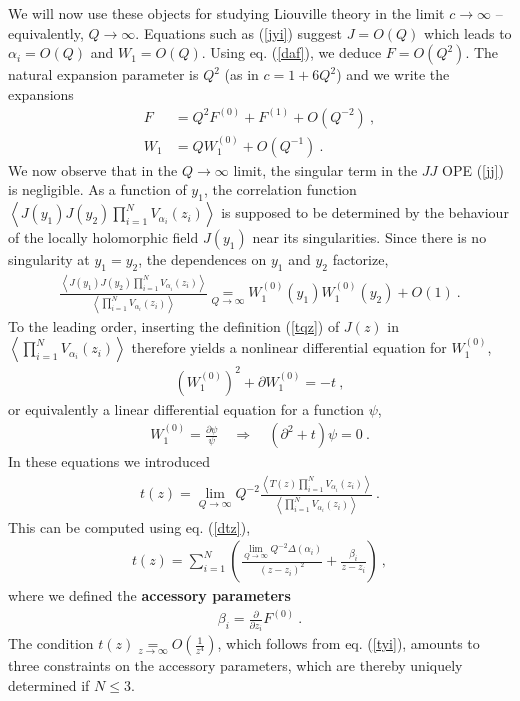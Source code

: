 \documentclass[12pt,a4paper,notitlepage]{report}
\newcommand \la {\left\langle}
\newcommand \ra {\right\rangle}
\newcommand \p {\partial}
\newcommand \pp[1] {{\frac{\p}{\p #1}}}
\numberwithin{equation}{section}
\theoremstyle{break}
\begin{document}
We will now use these objects for studying Liouville theory in the limit $c\rightarrow \infty$ -- equivalently, $Q\rightarrow \infty$. Equations such as (\ref{jyi}) suggest $J=O(Q)$ which leads to $\alpha_i=O(Q)$ and $W_1=O(Q)$. Using eq. (\ref{daf}), we deduce $F=O(Q^2)$. The natural expansion parameter is $Q^2$ (as in $c=1+6Q^2$) and we write the expansions
\begin{align}
 F &= Q^2 F^{(0)} + F^{(1)} + O(Q^{-2})\ ,
\\
W_1 & = QW_1^{(0)} + O(Q^{-1})\ .
\end{align}
We now observe that in the $Q\rightarrow \infty$ limit, the singular term in the $JJ$ OPE (\ref{jj}) is negligible. As a function of $y_1$, the correlation function $ \la J(y_1)J(y_2)\prod_{i=1}^N V_{\alpha_i}(z_i) \ra$ is supposed to be determined by the behaviour of the locally holomorphic field $J(y_1)$ near its singularities. Since there is no singularity at $y_1=y_2$, the dependences on $y_1$ and $y_2$  factorize,    
\begin{align}
 \frac{\la J(y_1)J(y_2)\prod_{i=1}^N V_{\alpha_i}(z_i)\ra}{\la \prod_{i=1}^N V_{\alpha_i}(z_i) \ra} \underset{Q\rightarrow \infty}{=} W_1^{(0)}(y_1)W_1^{(0)}(y_2) + O(1)\ .
\end{align}
To the leading order, inserting the definition (\ref{tqz}) of $J(z)$ in $\la \prod_{i=1}^N V_{\alpha_i}(z_i) \ra$ therefore yields a nonlinear differential equation for $W_1^{(0)}$,
\begin{align}
 \boxed{\left(W_1^{(0)}\right)^2 + \p W_1^{(0)} = - t}\ ,
\label{wwwt}
\end{align}
or equivalently a linear differential equation for a function $\psi$,
\begin{align}
 \boxed{W_1^{(0)} = \frac{\p\psi}{\psi} \quad \Rightarrow \quad (\p^2 + t ) \psi = 0}\ .
\label{dtp}
\end{align}
In these equations we introduced
\begin{align}
 t(z) = \underset{Q\rightarrow \infty}{\lim} Q^{-2} \frac{\la T(z) \prod_{i=1}^N V_{\alpha_i}(z_i) \ra}{\la \prod_{i=1}^N V_{\alpha_i}(z_i) \ra}\ .
\end{align}
This can be computed using eq. (\ref{dtz}), 
\begin{align}
 t(z) = \sum_{i=1}^N \left( \frac{\underset{Q\rightarrow\infty}{\lim} Q^{-2}\Delta(\alpha_i)}{(z-z_i)^2} + \frac{\beta_i}{z-z_i} \right)\ ,
\label{tzs}
\end{align}
where we defined the \textbf{\boldmath accessory parameters} 
\begin{align}
 \beta_i = \pp{z_i} F^{(0)}\ .
\end{align}
The condition $t(z) \underset{z\rightarrow \infty}{=} O(\frac{1}{z^4})$, which follows from eq. (\ref{tyi}), amounts to three constraints on the accessory parameters, which are thereby uniquely determined if $N\leq 3$. 
\end{document}
